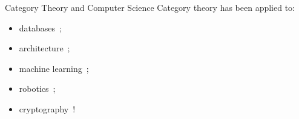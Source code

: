 \documentclass{beamer}
\begin{document}



\begin{frame}{Category Theory and Computer Science}
	Category theory has been applied to:\pause
	\begin{itemize}
		\item databases~\cite{bsw-databases};\pause
		\item architecture~\cite{healy};\pause
		\item machine learning~\cite{cruttwell};\pause
		\item robotics~\cite{aguado};\pause
		\item cryptography~\cite{broadbent-karvonen-2022}!
	\end{itemize}
\end{frame}
\end{document}
